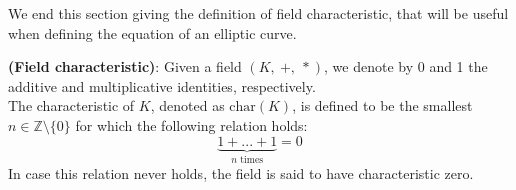 \bigskip
\noindent
We end this section giving the definition of field characteristic, that will be useful when defining the equation of an elliptic curve. 
\begin{mydef} {\bf (Field characteristic)}: Given a field $(K, \ +, \ *)$, we denote by 0 and 1 the additive and multiplicative identities, respectively.
\\
The characteristic of $K$, denoted as  $\text{char}(K)$, is defined to be the smallest $n \in \mathbb{Z} \text{\textbackslash} \{0\}$ for which the following relation holds: 
$$\underbrace{1 + ... + 1}_\text{$n$ times} = 0$$ 
In case this relation never holds, the field is said to have characteristic zero.
\end{mydef}

\bigskip

\bigskip

